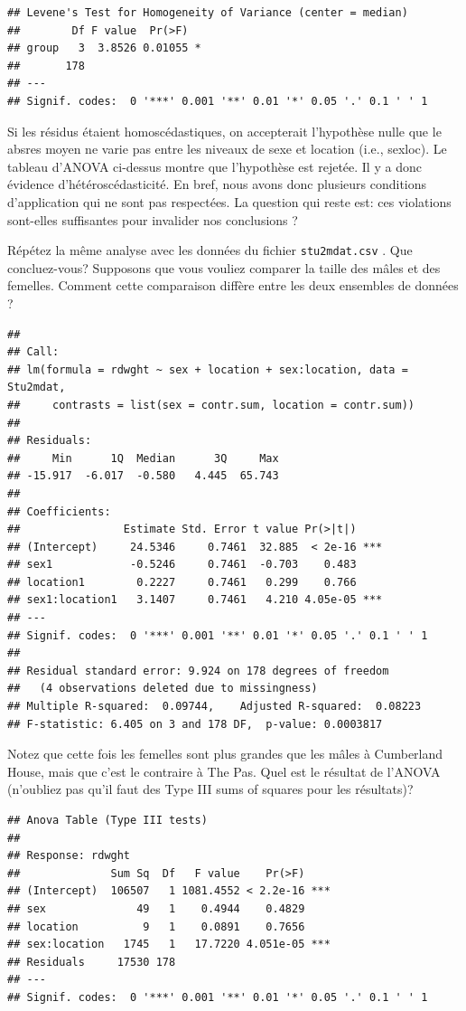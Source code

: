\documentclass[12pt,]{book}
\makeatletter
\newenvironment{kframe}{%
\medskip{}
\setlength{\fboxsep}{.8em}
\def\at@end@of@kframe{}%
\ifinner\ifhmode%
 \def\at@end@of@kframe{\end{minipage}}%
 \begin{minipage}{\columnwidth}%
\fi\fi%
\def\FrameCommand##1{\hskip\@totalleftmargin \hskip-\fboxsep
\colorbox{incolor}{##1}\hskip-\fboxsep
    \hskip-\linewidth \hskip-\@totalleftmargin \hskip\columnwidth}%
\MakeFramed {\advance\hsize-\width
  \@totalleftmargin\z@ \linewidth\hsize
  \@setminipage}}%
{\par\unskip\endMakeFramed%
\at@end@of@kframe}
\newenvironment{rmdblock}[1]
 {
 \begin{itemize}
 \renewcommand{\labelitemi}{
   \raisebox{-.7\height}[0pt][0pt]{
     {\setkeys{Gin}{width=3em,keepaspectratio}\texttt{[image: images/\#1]}}
   }
 }
 \begin{kframe}
 \setlength{\fboxsep}{1em}
 \item
 }
 {
 \end{kframe}
 \end{itemize}
 }
\newenvironment{rmdcode}
  {\begin{rmdblock}{screen}}
  {\end{rmdblock}}
\makeatother
\begin{document}
\begin{verbatim}
## Levene's Test for Homogeneity of Variance (center = median)
##        Df F value  Pr(>F)  
## group   3  3.8526 0.01055 *
##       178                  
## ---
## Signif. codes:  0 '***' 0.001 '**' 0.01 '*' 0.05 '.' 0.1 ' ' 1
\end{verbatim}

Si les résidus étaient homoscédastiques, on accepterait l'hypothèse nulle que le absres moyen ne varie pas entre les niveaux de sexe et location (i.e., sexloc). Le tableau d'ANOVA ci-dessus montre que l'hypothèse est rejetée. Il y a donc évidence d'hétéroscédasticité. En bref, nous avons donc plusieurs conditions d'application qui ne sont pas respectées. La question qui reste est: ces violations sont-elles suffisantes pour invalider nos conclusions ?

\begin{rmdcode}
Répétez la même analyse avec les données du fichier \texttt{stu2mdat.csv} . Que concluez-vous? Supposons que vous vouliez comparer la taille des mâles et des femelles. Comment cette comparaison diffère entre les deux ensembles de données ?
\end{rmdcode}

\begin{verbatim}
## 
## Call:
## lm(formula = rdwght ~ sex + location + sex:location, data = Stu2mdat, 
##     contrasts = list(sex = contr.sum, location = contr.sum))
## 
## Residuals:
##     Min      1Q  Median      3Q     Max 
## -15.917  -6.017  -0.580   4.445  65.743 
## 
## Coefficients:
##                Estimate Std. Error t value Pr(>|t|)    
## (Intercept)     24.5346     0.7461  32.885  < 2e-16 ***
## sex1            -0.5246     0.7461  -0.703    0.483    
## location1        0.2227     0.7461   0.299    0.766    
## sex1:location1   3.1407     0.7461   4.210 4.05e-05 ***
## ---
## Signif. codes:  0 '***' 0.001 '**' 0.01 '*' 0.05 '.' 0.1 ' ' 1
## 
## Residual standard error: 9.924 on 178 degrees of freedom
##   (4 observations deleted due to missingness)
## Multiple R-squared:  0.09744,    Adjusted R-squared:  0.08223 
## F-statistic: 6.405 on 3 and 178 DF,  p-value: 0.0003817
\end{verbatim}

Notez que cette fois les femelles sont plus grandes que les mâles à Cumberland House, mais que c'est le contraire à The Pas. Quel est le résultat de l'ANOVA (n'oubliez pas qu'il faut des Type III sums of squares pour les résultats)?

\begin{verbatim}
## Anova Table (Type III tests)
## 
## Response: rdwght
##              Sum Sq  Df   F value    Pr(>F)    
## (Intercept)  106507   1 1081.4552 < 2.2e-16 ***
## sex              49   1    0.4944    0.4829    
## location          9   1    0.0891    0.7656    
## sex:location   1745   1   17.7220 4.051e-05 ***
## Residuals     17530 178                        
## ---
## Signif. codes:  0 '***' 0.001 '**' 0.01 '*' 0.05 '.' 0.1 ' ' 1
\end{verbatim}
\end{document}
